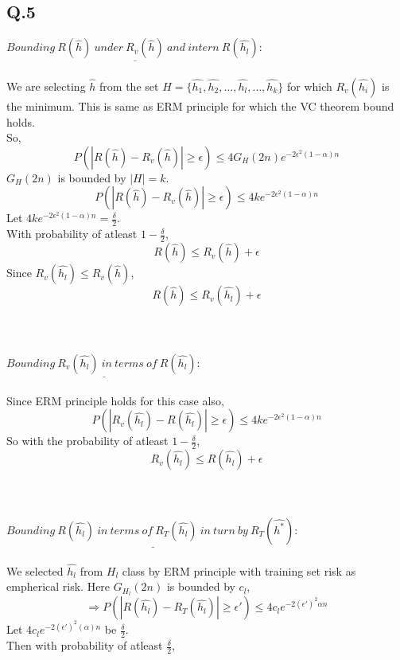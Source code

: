 \documentclass[17pt]{article}
\begin{document}
\subsection*{Q.5}
$\underline{Bounding\: R(\hat{h})\: under\: R_v(\hat{h})\: and\: intern\: R(\hat{h_l}) : }$\\
\\
We are selecting $\hat{h}$ from the set $H = \{ \hat{h_1}, \hat{h_2},  \ldots, \hat{h_l}, \ldots, \hat{h_k} \}$ for which $R_v(\hat{h_i})$ is the minimum. This is same as ERM principle for which the VC theorem bound holds.\\
So,
$$P\left( | R(\hat{h}) - R_v(\hat{h}) | \geq \epsilon \right) \leq 4 G_H(2n)e^{-2\epsilon^2(1-\alpha)n}$$
$G_H(2n)$ is bounded by $|H| = k$.
$$ P\left( | R(\hat{h}) - R_v(\hat{h}) | \geq \epsilon \right) \leq 4 ke^{-2\epsilon^2(1-\alpha)n}$$
Let $4 ke^{-2\epsilon^2(1-\alpha)n} = \frac{\delta}{2}$.\\
With probability of atleast $1-\frac{\delta}{2}$, 
$$ R(\hat{h}) \leq R_v(\hat{h}) + \epsilon$$
Since $R_v(\hat{h_l}) \leq R_v(\hat{h})$,
\begin{equation}
R(\hat{h}) \leq R_v(\hat{h_l}) + \epsilon \end{equation}\\
\\\\
$\underline{Bounding\: R_v(\hat{h_l})\: in\: terms\: of\: R(\hat{h_l}):}$\\
\\
Since ERM principle holds for this case also,
$$ P\left( | R_v(\hat{h_l}) - R(\hat{h_l}) | \geq \epsilon \right) \leq 4 ke^{-2\epsilon^2(1-\alpha)n}$$
So with the probability of atleast $1-\frac{\delta}{2}$, 
\begin{equation}
R_v(\hat{h_l}) \leq R(\hat{h_l}) + \epsilon
\end{equation}\\
\\\\
$\underline{Bounding\: R(\hat{h_l})\: in\: terms\: of\: R_T(\hat{h_l})\: in\: turn\: by\: R_T(\hat{h^*}):}$\\
\\
We selected $\hat{h_l}$ from $H_l$ class by ERM principle with training set risk as empherical risk. Here $G_{H_l}(2n)$ is bounded by $c_l$,
$$\Rightarrow P\left( | R(\hat{h_l}) - R_T(\hat{h_l}) | \geq \epsilon ' \right) \leq 4 c_le^{-2(\epsilon ')^2\alpha n}$$
Let $4 c_le^{-2(\epsilon ')^2(\alpha)n}$ be $\frac{\delta}{2}$.\\
Then with probability of atleast $\frac{\delta}{2}$,
\end{document}
